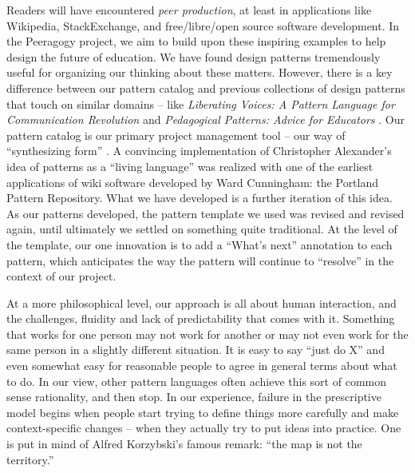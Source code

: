 Readers will have encountered \emph{peer production}, at least in applications like Wikipedia, StackExchange, and free/libre/open source software development.   In the Peeragogy project,  we aim to build upon these inspiring examples to help design the future of education.  
We have found design patterns tremendously useful for organizing our thinking about these matters.  However, there is a key difference between our pattern catalog and previous collections of design patterns that touch on similar domains -- like \emph{Liberating Voices: A Pattern Language for Communication Revolution} \cite{schuler2008liberating} and \emph{Pedagogical Patterns: Advice for Educators} \cite{bergin2012pedagogical}.  Our pattern catalog is our primary project management tool -- our way of ``synthesizing form'' \cite{alexander1964notes}. A convincing implementation of Christopher Alexander’s idea of patterns as a ``living language'' \cite[p.~xvii]{alexander1977pattern} was realized with one of the earliest applications of wiki software developed by Ward Cunningham: the Portland Pattern Repository.  What we have developed is a further iteration of this idea.   As our patterns developed, the pattern template we used was revised and revised again, until ultimately we settled on something quite traditional.  At the level of the template, our one innovation is to add a ``What's next'' annotation to each pattern, which anticipates the way the pattern will continue to ``resolve'' in the context of our project. 

At a more philosophical level, our approach is all about human interaction, and the challenges, fluidity and lack of predictability that comes with it.  Something that works for one person may not work for another or may not even work for the same person in a slightly different situation.  It is easy to say ``just do X'' and even somewhat easy for reasonable people to agree in general terms about what to do.  In our view, other pattern languages often achieve this sort of common sense rationality, and then stop.  In our experience, failure in the prescriptive model begins when people start trying to define things more carefully and make context-specific changes -- when they actually try to put ideas into practice. One is put in mind of Alfred Korzybski's famous remark: ``the map is not the territory.''  

